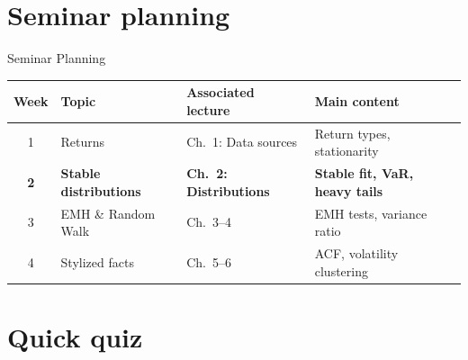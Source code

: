 \documentclass[9pt, aspectratio=169, t]{beamer}
\theoremstyle{definition}
\begin{document}
\section{Seminar planning}

\begin{frame}{Seminar Planning}
\renewcommand{\arraystretch}{1.3}
\begin{center}
\begin{tabular}{clll}
\toprule
\textbf{Week} & \textbf{Topic} & \textbf{Associated lecture} & \textbf{Main content} \\
\midrule
1 & Returns & Ch.\ 1: Data sources & Return types, stationarity \\
\rowcolor{MainBlue!10}
\textbf{2} & \textbf{Stable distributions} & \textbf{Ch.\ 2: Distributions} & \textbf{Stable fit, VaR, heavy tails} \\
3 & EMH \& Random Walk & Ch.\ 3--4 & EMH tests, variance ratio \\
4 & Stylized facts & Ch.\ 5--6 & ACF, volatility clustering \\
\bottomrule
\end{tabular}
\end{center}
\end{frame}

\section{Quick quiz}
\end{document}
